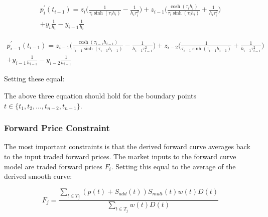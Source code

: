 \documentclass{article}
\begin{document}
\begin{multline}
    p^\prime_i(t_{i-1}) = z_i \biggl( \frac{1}{\tau_i \sinh(\tau_i h_i)} - \frac{1}{h_i \tau_i^2} \biggr) 
        + z_{i-1} \biggl( \frac{ \cosh(\tau_i h_i)}{\tau_i \sinh(\tau_i h_i)} + \frac{1}{h_i \tau_i^2} \biggr)\\
        + y_i \frac{1}{h_i} - y_{i - 1} \frac{1}{h_i}
\end{multline}

\begin{multline}
    p^\prime_{i-1}(t_{i-1}) = z_{i-1} \biggl( \frac{ \cosh(\tau_{i-1} h_{i-1})}{\tau_{i-1} \sinh(\tau_{i-1} h_{i-1})} - \frac{1}{h_{i-1} \tau_{i-1}^2} \biggr) 
        + z_{i-2} \biggl( \frac{1}{\tau_{i-1} \sinh(\tau_{i-1} h_{i-1})} + \frac{1}{h_{i-1} \tau_{i-1}^2} \biggr)\\
        + y_{i-1} \frac{1}{h_{i-1}} - y_{i-2} \frac{1}{h_{i-1}}
\end{multline}

Setting these equal:




\bigskip

The above three equation should hold for the boundary points \\
$t \in \{t_1, t_2, \hdots, t_{n-2}, t_{n-1}\}$.

\subsubsection{Forward Price Constraint}
The most important constraints is that the derived forward curve averages back to the 
input traded forward prices.
The market inputs to the forward curve model are traded forward prices $F_i$.
Setting this equal to the average of the derived smooth curve:

\begin{equation}
    \label{eq:traded_forward_calc}
    F_j = \frac{\sum_{t \in T_j} (p(t) + S_{add}(t))S_{mult}(t)w(t)D(t)}
    {\sum_{t \in T_j} w(t)D(t)}
\end{equation}
\end{document}
